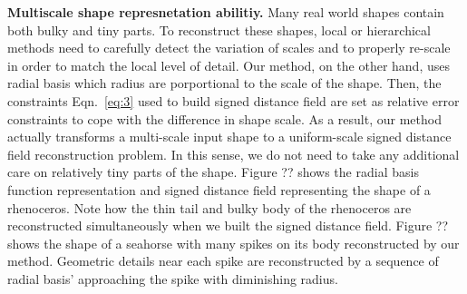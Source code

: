 \documentclass[review]{acmsiggraph}
\begin{document}
\textbf{Multiscale shape represnetation abilitiy. } 
Many real world shapes contain both bulky and tiny parts. To reconstruct these shapes, local or hierarchical methods need to carefully detect the variation of scales and to properly re-scale in order to match the local level of detail. Our method, on the other hand, uses radial basis which radius are porportional to the scale of the shape. Then, the constraints Eqn.~\ref{eq:3} used to build signed distance field are set as relative error constraints to cope with the difference in shape scale. As a result, our method actually transforms a multi-scale input shape to a uniform-scale signed distance field reconstruction problem. In this sense, we do not need to take any additional care on relatively tiny parts of the shape. Figure ?? shows the radial basis function representation and signed distance field representing the shape of a rhenoceros. Note how the thin tail and bulky body of the rhenoceros are reconstructed simultaneously when we built the signed distance field. Figure ?? shows the shape of a seahorse with many spikes on its body reconstructed by our method. Geometric details near each spike are reconstructed by a sequence of radial basis' approaching the spike with diminishing radius. 
\end{document}
